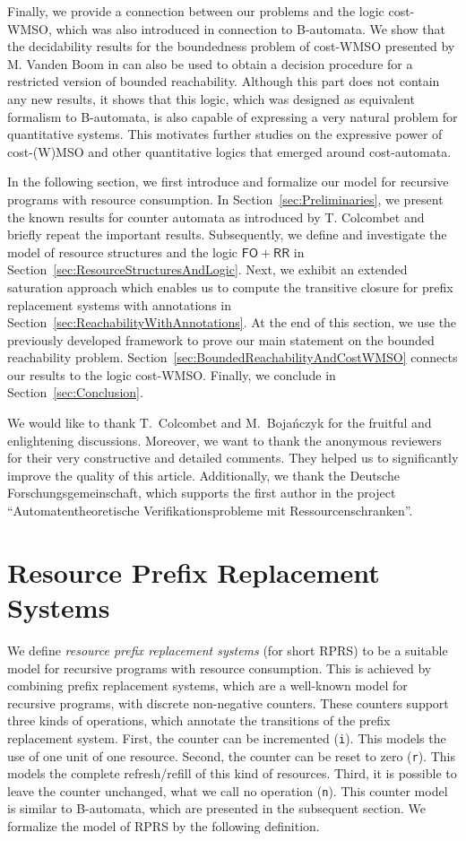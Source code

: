 \documentclass{LMCS}
\newcommand{\FORR}{\ensuremath{\mathsf{FO\!\!+\!\!RR}}}
\newcommand{\RPRS}{\textsf{RPRS}}
\begin{document}
Finally, we provide a connection between our problems and the logic cost-WMSO,
which was also introduced in connection to B-automata. We show that the
decidability results for the boundedness problem of cost-WMSO presented by M.
Vanden Boom in \cite{costwMSO} can also be used to obtain a decision procedure
for a restricted version of bounded reachability. Although this part does not
contain any new results, it shows that this logic, which was designed 
as equivalent formalism to B-automata, is also capable of expressing
a very natural problem for quantitative systems. This motivates further studies
on the expressive power of cost-(W)MSO and other quantitative logics that emerged
around cost-automata. 


In the following section, we first introduce and formalize our model for
recursive programs with resource consumption. In
Section~\ref{sec:Preliminaries}, we present the known results for counter
automata as introduced by T. Colcombet and briefly repeat the important
results. Subsequently, we define and investigate the model of resource
structures and the logic \FORR{} in
Section~\ref{sec:ResourceStructuresAndLogic}. Next, we exhibit an extended
saturation approach which enables us to compute the transitive closure
for prefix replacement systems with annotations in
Section~\ref{sec:ReachabilityWithAnnotations}. At the end of this section, we
use the previously developed framework to prove our main statement on the
bounded reachability problem. Section~\ref{sec:BoundedReachabilityAndCostWMSO}
connects our results to the logic cost-WMSO. Finally, we conclude in
Section~\ref{sec:Conclusion}.

We would like to thank T.~Colcombet and M.~Bojańczyk for the fruitful and
enlightening discussions. Moreover, we want to thank the anonymous reviewers 
for their very constructive and detailed comments. They helped us to 
significantly improve the quality of this article. Additionally, we thank the 
Deutsche Forschungsgemeinschaft, which supports the first author in 
the project ``Automatentheoretische Verifikationsprobleme mit Ressourcenschranken''.

\section{Resource Prefix Replacement Systems}
\label{sec:ResourcePRS}

We define \emph{resource prefix replacement systems} (for short \RPRS{}) to be a
suitable model for recursive programs with resource consumption. This is
achieved by combining prefix replacement systems, which are a well-known model
for recursive programs, with discrete non-negative counters. These counters
support three kinds of operations, which annotate the transitions of the
prefix replacement system. First, the counter can be incremented (\texttt{i}).
This models the use of one unit of one resource. Second, the counter can be
reset to zero (\texttt{r}). This models the complete refresh/refill of this
kind of resources. Third, it is possible to leave the counter unchanged, what we
call no operation (\texttt{n}). This counter model is similar to B-automata,
which are presented in the subsequent section. We formalize the model of
\RPRS{} by the following definition.
\end{document}
